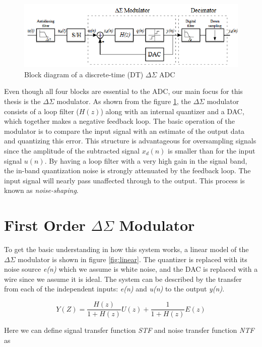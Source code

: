 \begin{figure}[h]
\centering
\includegraphics[scale=0.8]{images/delta_sigma_block.png}
\caption{Block diagram of a discrete-time (DT) $\Delta\Sigma$ ADC\cite{deltapic}}
\label{fig:delta_block}
\end{figure}

Even though all four blocks are essential to the ADC, our main focus for this thesis is the $\Delta\Sigma$ modulator. As shown from the figure \ref{fig:delta_block}, the $\Delta\Sigma$ modulator consists of a loop filter ($H(z)$) along with an internal quantizer and a DAC, which together makes a negative feedback loop. The basic operation of the modulator is to compare the input signal with an estimate of the output data and quantizing this error. This structure is advantageous for oversampling signals since the amplitude of the subtracted signal $x_d(n)$ is smaller than for the input signal $u(n)$. By having a loop filter with a very high gain in the signal band, the in-band quantization noise is strongly attenuated by the feedback loop. The input signal will nearly pass unaffected through to the output. This process is known as \textit{noise-shaping}.

\section{First Order $\Delta\Sigma$ Modulator}\label{first_order}
To get the basic understanding in how this system works, a linear model of the $\Delta\Sigma$ modulator is shown in figure \ref{fig:linear}. The quantizer is replaced with its noise source \textit{e(n)} which we assume is white noise, and the DAC is replaced with a wire since we assume it is ideal. The system can be described by the transfer from each of the independent inputs: \textit{e(n)} and \textit{u(n)} to the output \textit{y(n)}. 

\begin{equation}
    Y(Z) = \frac{H(z)}{1+H(z)}U(z) + \frac{1}{1+H(z)}E(z)
\end{equation}

Here we can define signal transfer function \textit{STF} and noise transfer function \textit{NTF} as

